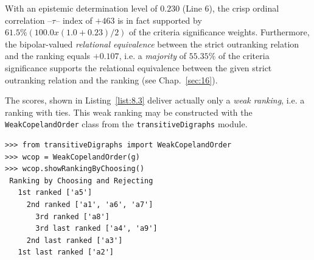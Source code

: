 With an epistemic determination level of $0.230$ (Line 6), the crisp ordinal correlation --\Kendall $\tau$-- index of $+463$ is in fact supported by $61.5\% (100.0 x (1.0 + 0.23)/2)$ of the criteria significance weights. Furthermore, the bipolar-valued \emph{relational equivalence} between the strict outranking relation and the \Copeland ranking equals $+0.107$, i.e. a \emph{majority} of $55.35\%$ of the criteria significance supports the relational equivalence between the given strict outranking relation and the \Copeland ranking (see Chap.~\ref{sec:16}).

The \Copeland scores, shown in Listing~\vref{list:8.3} deliver actually only a \emph{weak ranking}, i.e. a ranking with ties. This weak ranking may be constructed with the \texttt{WeakCopelandOrder} class  from the \texttt{transitiveDigraphs} module.
\begin{lstlisting}[caption={Computing a weak \Copeland ranking},label=list:8.5]
>>> from transitiveDigraphs import WeakCopelandOrder
>>> wcop = WeakCopelandOrder(g)
>>> wcop.showRankingByChoosing()
 Ranking by Choosing and Rejecting
   1st ranked ['a5']
     2nd ranked ['a1', 'a6', 'a7']
       3rd ranked ['a8']
       3rd last ranked ['a4', 'a9']
     2nd last ranked ['a3']
   1st last ranked ['a2']
\end{lstlisting}

